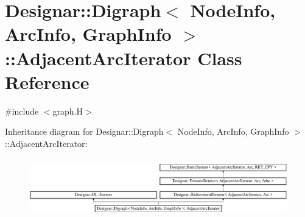 \hypertarget{class_designar_1_1_digraph_1_1_adjacent_arc_iterator}{}\section{Designar\+:\+:Digraph$<$ Node\+Info, Arc\+Info, Graph\+Info $>$\+:\+:Adjacent\+Arc\+Iterator Class Reference}
\label{class_designar_1_1_digraph_1_1_adjacent_arc_iterator}


{\ttfamily \#include $<$graph.\+H$>$}

Inheritance diagram for Designar\+:\+:Digraph$<$ Node\+Info, Arc\+Info, Graph\+Info $>$\+:\+:Adjacent\+Arc\+Iterator\+:\begin{figure}[H]
\begin{center}
\leavevmode
\includegraphics[height=2.604651cm]{class_designar_1_1_digraph_1_1_adjacent_arc_iterator}
\end{center}
\end{figure}
